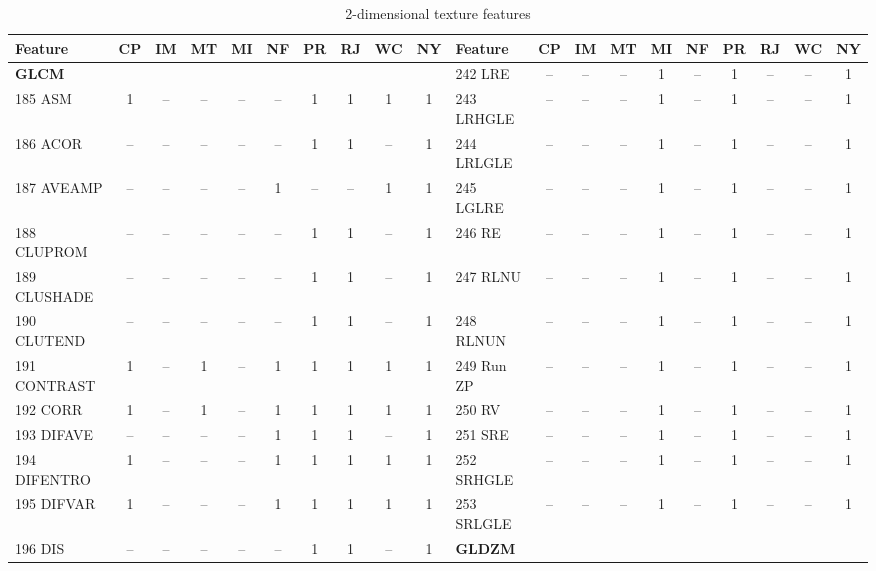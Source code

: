 \documentclass[sn-mathphys,Numbered]{sn-jnl}%
\theoremstyle{thmstyleone}%
\theoremstyle{thmstyletwo}%
\theoremstyle{thmstylethree}%
\begin{document}

\begin{table}[!hbt]
\centering
\caption {2-dimensional texture features}
\label {table:TEXTURE}
\begin{tiny}
\begin{tabular} { l  c  c  c  c  c  c  c  c  c    l  c  c  c  c  c  c  c  c  c }
 \toprule
  Feature & CP &  IM &  MT &  MI & NF &  PR &  RJ & WC & NY &   Feature & CP &  IM &  MT &  MI & NF &  PR &  RJ & WC & NY \\
  \midrule
\hspace{2mm}  \bf GLCM \rm  &  &   &   &   &   &   &   &  &  &  242 LRE & -- &  -- &  -- &  1 &  -- &  1 &  -- & -- &  1 \\ %
 185 ASM & 1 &  -- &  -- &  -- &  -- &  1 &  1 & 1 & 1 &  243 LRHGLE & -- &  -- &  -- &  1 &  -- &  1 &  -- & -- &  1 \\
 186 ACOR & -- &  -- &  -- &  -- &  -- &  1 &  1 & -- & 1 &  244 LRLGLE & -- &  -- &  -- &  1 &  -- &  1 &  -- & -- &  1 \\
 187 AVEAMP & -- &  -- &  -- &  -- &  1 &  -- &  -- & 1 & 1 &  245 LGLRE & -- &  -- &  -- &  1 &  -- &  1 &  -- & -- &  1 \\
 188 CLUPROM & -- &  -- &  -- &  -- &  -- &  1 &  1 & -- & 1 &  246 RE & -- &  -- &  -- &  1 &  -- &  1 &  -- & -- &  1 \\
 189 CLUSHADE & -- &  -- &  -- &  -- &  -- &  1 &  1 & -- & 1 &  247 RLNU & -- &  -- &  -- &  1 &  -- &  1 &  -- & -- &  1 \\
 190 CLUTEND & -- &  -- &  -- &  -- &  -- &  1 &  1 & -- & 1 &  248 RLNUN & -- &  -- &  -- &  1 &  -- &  1 &  -- & -- &  1 \\
 191 CONTRAST & 1 &  -- &  1 &  -- &  1 &  1 &  1 & 1 & 1 &  249 Run ZP & -- &  -- &  -- &  1 &  -- &  1 &  -- & -- &  1 \\ %
 192 CORR & 1 &  -- &  1 &  -- &  1 &  1 &  1 & 1 & 1 &  250 RV & -- &  -- &  -- &  1 &  -- &  1 &  -- & -- &  1 \\
 193 DIFAVE & -- &  -- &  -- &  -- &  1 &  1 &  1 & -- & 1 &  251 SRE & -- &  -- &  -- &  1 &  -- &  1 &  -- & -- &  1 \\
 194 DIFENTRO & 1 &  -- &  -- &  -- &  1 &  1 &  1 & 1 & 1 &  252 SRHGLE & -- &  -- &  -- &  1 &  -- &  1 &  -- & -- &  1 \\
 195 DIFVAR & 1 &  -- &  -- &  -- &  1 &  1 &  1 & 1 & 1 &  253 SRLGLE & -- &  -- &  -- &  1 &  -- &  1 &  -- & -- &  1 \\
 196 DIS & -- &  -- &  -- &  -- &  -- &  1 &  1 & -- & 1 & \hspace{2mm}  \bf GLDZM \rm  &  &   &   &   &   &   &   &  &   \\

\end{tabular}
\end{tiny}
\end{table}
\end{document}
